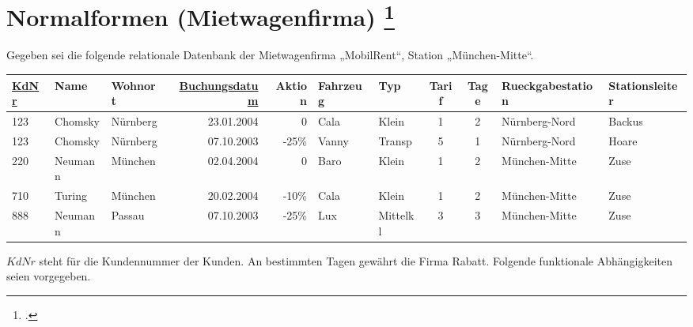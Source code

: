 \documentclass{bschlangaul-aufgabe}
\begin{document}

\let\fa=\bFunktionaleAbhaengigkeit

\section{Normalformen (Mietwagenfirma)
\footcite[Seite 2 Normalformen, Aufgabe 3]{db:pu:4}
}

Gegeben sei die folgende relationale Datenbank der Mietwagenfirma
„MobilRent“, Station „München-Mitte“.

\begin{center}
\tiny
\begin{tabular}{lllrrllccll}
\underline{KdNr} & Name & Wohnort & \underline{Buchungsdatum} & Aktion & Fahrzeug & Typ &
Tarif & Tage & Rueckgabestation & Stationsleiter
\\\hline

123 & Chomsky & Nürnberg & 23.01.2004 & 0 & Cala & Klein &
1 & 2 & Nürnberg-Nord & Backus \\

123 & Chomsky & Nürnberg & 07.10.2003 & -25\% & Vanny & Transp &
5 & 1 & Nürnberg-Nord & Hoare \\

220 & Neumann & München & 02.04.2004 & 0 & Baro & Klein &
1 & 2 & München-Mitte & Zuse \\

710 & Turing & München & 20.02.2004 & -10\% & Cala & Klein &
1 & 2 & München-Mitte & Zuse \\

888 & Neumann & Passau & 07.10.2003 & -25\% & Lux & Mittelkl &
3 & 3 & München-Mitte & Zuse \\
\end{tabular}
\end{center}

\noindent
$KdNr$ steht für die Kundennummer der Kunden. An bestimmten Tagen
gewährt die Firma Rabatt. Folgende funktionale Abhängigkeiten seien
vorgegeben.
\end{document}

